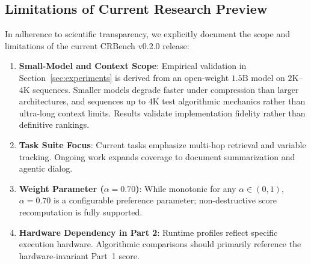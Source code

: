 \documentclass[11pt,a4paper]{article}
\begin{document}
\subsection{Limitations of Current Research Preview}
In adherence to scientific transparency, we explicitly document the scope and limitations of the current CRBench v0.2.0 release:
\begin{enumerate}[leftmargin=*,itemsep=0.5pt,topsep=1.0pt,parsep=0pt]
    \item \textbf{Small-Model and Context Scope}: Empirical validation in Section~\ref{sec:experiments} is derived from an open-weight $1.5\text{B}$ model on $2\text{K}$--$4\text{K}$ sequences. Smaller models degrade faster under compression than larger architectures, and sequences up to 4K test algorithmic mechanics rather than ultra-long context limits. Results validate implementation fidelity rather than definitive rankings.
    \item \textbf{Task Suite Focus}: Current tasks emphasize multi-hop retrieval and variable tracking. Ongoing work expands coverage to document summarization and agentic dialog.
    \item \textbf{Weight Parameter ($\alpha = 0.70$)}: While monotonic for any $\alpha \in (0, 1)$, $\alpha = 0.70$ is a configurable preference parameter; non-destructive score recomputation is fully supported.
    \item \textbf{Hardware Dependency in Part 2}: Runtime profiles reflect specific execution hardware. Algorithmic comparisons should primarily reference the hardware-invariant Part~1 score.
\end{enumerate}
\end{document}

